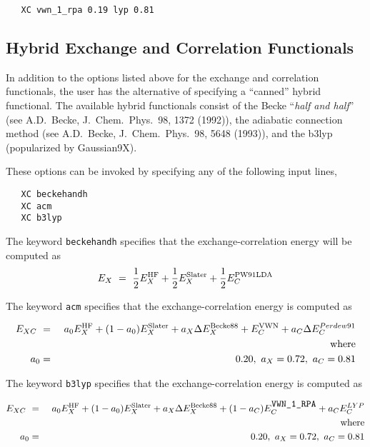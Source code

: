 \begin{verbatim}
   XC vwn_1_rpa 0.19 lyp 0.81
\end{verbatim}

  

\subsection{Hybrid Exchange and Correlation Functionals}

In addition to the options listed above for the exchange and correlation
functionals, the user has the alternative of specifying a ``canned'' hybrid
functional.  The available hybrid functionals consist of the Becke
``{\sl half and half}'' (see A.D.~Becke, J.~Chem.~Phys.~98, 1372 (1992)), the
adiabatic connection method (see A.D.~Becke, J.~Chem.~Phys.~98, 5648
(1993)), and the b3lyp (popularized by Gaussian9X).

These options can be invoked by specifying any of the following input lines,

\begin{verbatim}
   XC beckehandh
   XC acm
   XC b3lyp
\end{verbatim}

The keyword \verb+beckehandh+ specifies that the exchange-correlation energy will be
computed as 
\begin{eqnarray*}
E_{X} \ = \ \frac{1}{2} E^{\rm HF}_X + \frac{1}{2} E^{\rm
  Slater}_{X} + \frac{1}{2} E^{\rm PW91LDA}_{C}
\end{eqnarray*}

The keyword \verb+acm+ specifies that the exchange-correlation energy
is computed as

\begin{eqnarray*}
E_{XC} \ &=& \ a_0 E^{\rm HF}_X + (1-a_0) E^{\rm Slater}_{X} +
a_X \Delta E^{\rm Becke88}_{X} + E^{\rm VWN}_C + a_C \Delta E^{Perdew91}_C \\
& &{\rm where } \\
a_0 &=& 0.20, \ a_X = 0.72, \ a_C = 0.81
\end{eqnarray*}

The keyword \verb+b3lyp+ specifies that the exchange-correlation energy
is computed as

\begin{eqnarray*}
E_{XC} \ &=& \ a_0 E^{\rm HF}_X + (1-a_0) E^{\rm Slater}_{X} +
a_X \Delta E^{\rm Becke88}_{X} + (1-a_C)E^{\rm \verb+VWN_1_RPA+}_C + a_C E^{LYP}_C \\
& &{\rm where } \\
a_0 &=& 0.20, \ a_X = 0.72, \ a_C = 0.81
\end{eqnarray*}


